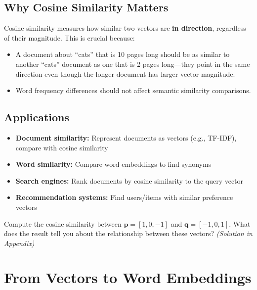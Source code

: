 \documentclass[11pt,a4paper]{article}
\begin{document}
\subsection{Why Cosine Similarity Matters}

\begin{tcolorbox}[intuitionbox={Direction vs.\ Magnitude}]
Cosine similarity measures how similar two vectors are \textbf{in direction}, regardless of their magnitude. This is crucial because:
\begin{itemize}[leftmargin=1em, itemsep=2pt]
    \item A document about ``cats'' that is 10 pages long should be as similar to another ``cats'' document as one that is 2 pages long---they point in the same direction even though the longer document has larger vector magnitude.
    \item Word frequency differences should not affect semantic similarity comparisons.
\end{itemize}
\end{tcolorbox}

\subsection{Applications}

\begin{itemize}[leftmargin=1.5em]
    \item \textbf{Document similarity:} Represent documents as vectors (e.g., TF-IDF), compare with cosine similarity
    \item \textbf{Word similarity:} Compare word embeddings to find synonyms
    \item \textbf{Search engines:} Rank documents by cosine similarity to the query vector
    \item \textbf{Recommendation systems:} Find users/items with similar preference vectors
\end{itemize}

\begin{tcolorbox}[questionbox={Self-Check Q5}]
Compute the cosine similarity between $\mathbf{p} = [1, 0, -1]$ and $\mathbf{q} = [-1, 0, 1]$. What does the result tell you about the relationship between these vectors? \textit{(Solution in Appendix)}
\end{tcolorbox}

\section{From Vectors to Word Embeddings}
\end{document}
